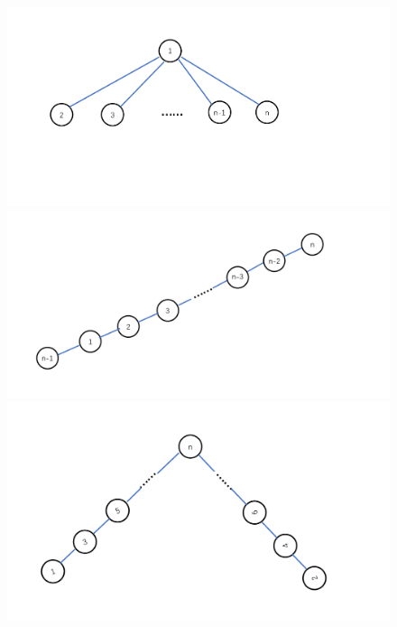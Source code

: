 \begin{figure}
\begin{center}
\caption{ }
\includegraphics[scale=0.4]{figures/15_1.png}
\caption{ }
\includegraphics[scale=0.4]{figures/15_2.png}
\caption{ }
\includegraphics[scale=0.4]{figures/15_3.png}
\end{center}
\end{figure}
